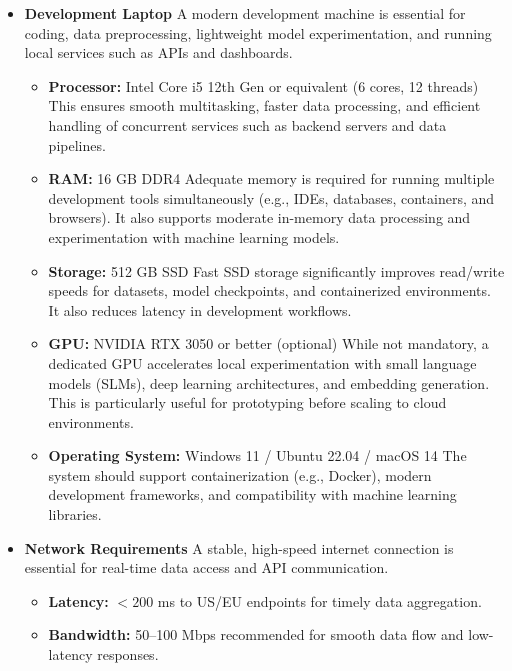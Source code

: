 \documentclass[12pt,a4paper,oneside,openany]{book}
\begin{document}
\begin{itemize}[leftmargin=8mm]

\item \textbf{Development Laptop}
A modern development machine is essential for coding, data preprocessing, lightweight model experimentation, and running local services such as APIs and dashboards.

\begin{itemize}[leftmargin=8mm]
\item \textbf{Processor:} Intel Core i5 12th Gen or equivalent (6 cores, 12 threads)
This ensures smooth multitasking, faster data processing, and efficient handling of concurrent services such as backend servers and data pipelines.

\item \textbf{RAM:} 16 GB DDR4
Adequate memory is required for running multiple development tools simultaneously (e.g., IDEs, databases, containers, and browsers). It also supports moderate in-memory data processing and experimentation with machine learning models.

\item \textbf{Storage:} 512 GB SSD
Fast SSD storage significantly improves read/write speeds for datasets, model checkpoints, and containerized environments. It also reduces latency in development workflows.

\item \textbf{GPU:} NVIDIA RTX 3050 or better (optional)
While not mandatory, a dedicated GPU accelerates local experimentation with small language models (SLMs), deep learning architectures, and embedding generation. This is particularly useful for prototyping before scaling to cloud environments.

\item \textbf{Operating System:} Windows 11 / Ubuntu 22.04 / macOS 14
The system should support containerization (e.g., Docker), modern development frameworks, and compatibility with machine learning libraries.

\end{itemize}
\item \textbf{Network Requirements}
A stable, high-speed internet connection is essential for real-time data access and API communication.

\begin{itemize}[leftmargin=8mm]
\item \textbf{Latency:} $<200$ ms to US/EU endpoints for timely data aggregation.
\item \textbf{Bandwidth:} 50--100 Mbps recommended for smooth data flow and low-latency responses.
\end{itemize}


\end{itemize}
\end{document}
